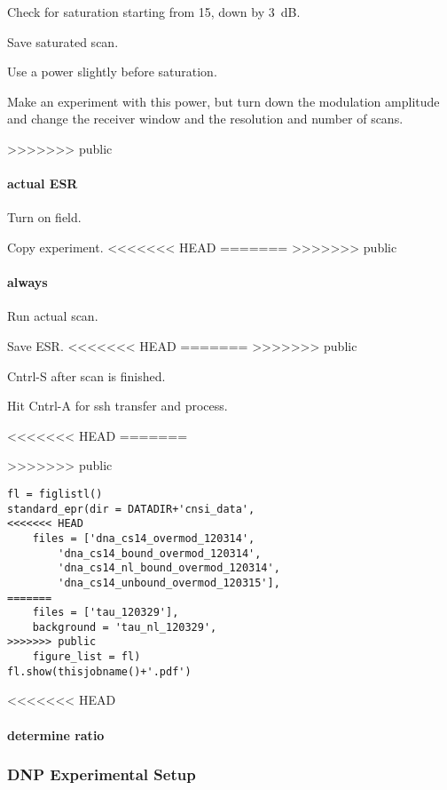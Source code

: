 Check for saturation starting from 15, down by 3~dB.

Save saturated scan.

Use a power slightly before saturation.

Make an experiment with this power, but turn down the modulation amplitude and change the receiver window and the resolution and number of scans.

>>>>>>> public
\paragraph{actual ESR}
Turn on field.

Copy experiment.
<<<<<<< HEAD
=======
>>>>>>> public

\paragraph{always}
Run actual scan.

Save ESR.
<<<<<<< HEAD
=======
>>>>>>> public

Cntrl-S after scan is finished.

Hit Cntrl-A for ssh transfer and process.

<<<<<<< HEAD
=======

>>>>>>> public
\begin{tiny}
\begin{lstlisting}
fl = figlistl()
standard_epr(dir = DATADIR+'cnsi_data',
<<<<<<< HEAD
    files = ['dna_cs14_overmod_120314',
        'dna_cs14_bound_overmod_120314',
        'dna_cs14_nl_bound_overmod_120314',
        'dna_cs14_unbound_overmod_120315'],
=======
    files = ['tau_120329'],
    background = 'tau_nl_120329',
>>>>>>> public
    figure_list = fl)
fl.show(thisjobname()+'.pdf')
\end{lstlisting}
\end{tiny}

<<<<<<< HEAD
\paragraph{determine ratio}
\subsubsection{DNP Experimental Setup}

